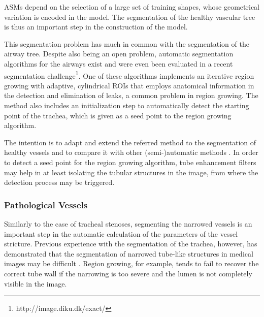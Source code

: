 ASMs depend on the selection of a large set of training shapes, whose geometrical variation is encoded in the model. The segmentation of the healthy vascular tree is thus an important step in the construction of the model. 

\approach

This segmentation problem has much in common with the segmentation of the airway tree. Despite also being an open problem, automatic segmentation algorithms for the airways exist and were even been evaluated in a recent segmentation challenge\footnote{http://image.diku.dk/exact/}. One of these algorithms \citep{Pinho:Airways2} implements an iterative region growing with adaptive, cylindrical ROIs that employs anatomical information in the detection and elimination of leaks, a common problem in region growing. The method also includes an initialization step to automatically detect the starting point of the trachea, which is given as a seed point to the region growing algorithm. 


The intention is to adapt and extend the referred method to the segmentation of healthy vessels and to compare it with other (semi-)automatic methods \citep{Zhou20121,CARR-07,FLOR-07b,Florez2,Scherl200721,Antiga,Bemmel}. In order to detect a seed point for the region growing algorithm, tube enhancement filters \citep{ORLO-09} may help in at least isolating the tubular structures in the image, from where the detection process may be triggered. 

\subsubsection{Pathological Vessels}
\label{sec:narrowedarteries}

\challenge
Similarly to the case of tracheal stenoses, segmenting the narrowed vessels is an important step in the automatic calculation of the parameters of the vessel stricture. Previous experience with the segmentation of the trachea, however, has demonstrated that the segmentation of narrowed tube-like structures in medical images may be difficult \citep{Triglia,Pinho:Trachea7}. Region growing, for example, tends to fail to recover the correct tube wall if the narrowing is too severe and the lumen is not completely visible in the image. 

